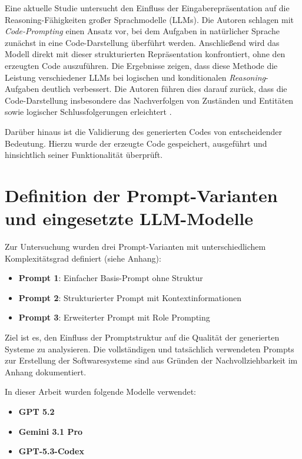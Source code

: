 Eine aktuelle Studie untersucht den Einfluss der Eingaberepräsentation auf
die Reasoning-Fähigkeiten großer Sprachmodelle (LLMs).
Die Autoren schlagen mit  \textit{Code-Prompting} einen Ansatz vor, 
bei dem Aufgaben in natürlicher Sprache zunächst in eine Code-Darstellung überführt werden.
Anschließend wird das Modell direkt mit dieser strukturierten
Repräsentation konfrontiert, ohne den erzeugten Code auszuführen.
Die Ergebnisse zeigen, dass diese Methode die Leistung verschiedener
LLMs bei logischen und konditionalen \textit{Reasoning}-Aufgaben deutlich verbessert.
Die Autoren führen dies darauf zurück, dass die Code-Darstellung insbesondere
das Nachverfolgen von Zuständen und Entitäten sowie logischer Schlussfolgerungen erleichtert \cite{puerto-etal-2024-code}.


Darüber hinaus ist die Validierung des generierten Codes
von entscheidender Bedeutung. Hierzu wurde der erzeugte
Code gespeichert, ausgeführt und hinsichtlich seiner
Funktionalität überprüft.

\section{Definition der Prompt-Varianten und eingesetzte LLM-Modelle}

Zur Untersuchung wurden drei Prompt-Varianten mit
unterschiedlichem Komplexitätsgrad definiert (siehe Anhang):

\begin{itemize}
\item \textbf{Prompt 1}: Einfacher Basis-Prompt ohne Struktur
\item \textbf{Prompt 2}: Strukturierter Prompt mit Kontextinformationen
\item \textbf{Prompt 3}: Erweiterter Prompt mit Role Prompting
\end{itemize}

Ziel ist es, den Einfluss der Promptstruktur auf die
Qualität der generierten Systeme zu analysieren. Die vollständigen und tatsächlich verwendeten Prompts zur
Erstellung der Softwaresysteme sind aus Gründen der
Nachvollziehbarkeit im Anhang dokumentiert.


In dieser Arbeit wurden folgende Modelle verwendet:

\begin{itemize}
\item \textbf{GPT 5.2}
\item \textbf{Gemini 3.1 Pro}
\item \textbf{GPT-5.3-Codex}

\end{itemize}

